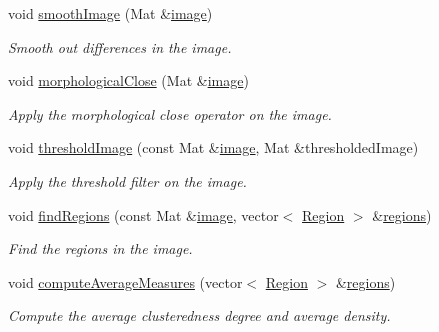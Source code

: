 \begin{DoxyCompactItemize}
void \hyperlink{classmultiscale_1_1analysis_1_1RegionDetector_a895f12ad46f2e0d1db45637a5935c2b5}{smooth\-Image} (\-Mat \&\hyperlink{classmultiscale_1_1analysis_1_1Detector_a523830a6cfe409694ce8327c3c736fbd}{image})
\begin{DoxyCompactList}\small\item\em \-Smooth out differences in the image. \end{DoxyCompactList}\item 
void \hyperlink{classmultiscale_1_1analysis_1_1RegionDetector_adcb8ab3ced63de9168734f0b24072705}{morphological\-Close} (\-Mat \&\hyperlink{classmultiscale_1_1analysis_1_1Detector_a523830a6cfe409694ce8327c3c736fbd}{image})
\begin{DoxyCompactList}\small\item\em \-Apply the morphological close operator on the image. \end{DoxyCompactList}\item 
void \hyperlink{classmultiscale_1_1analysis_1_1RegionDetector_a614cd80fac5d3df2a25c401bb221149c}{threshold\-Image} (const \-Mat \&\hyperlink{classmultiscale_1_1analysis_1_1Detector_a523830a6cfe409694ce8327c3c736fbd}{image}, \-Mat \&thresholded\-Image)
\begin{DoxyCompactList}\small\item\em \-Apply the threshold filter on the image. \end{DoxyCompactList}\item 
void \hyperlink{classmultiscale_1_1analysis_1_1RegionDetector_a886ec5ee1cd2fd816c1cfd4e2ea6778e}{find\-Regions} (const \-Mat \&\hyperlink{classmultiscale_1_1analysis_1_1Detector_a523830a6cfe409694ce8327c3c736fbd}{image}, vector$<$ \hyperlink{classmultiscale_1_1analysis_1_1Region}{\-Region} $>$ \&\hyperlink{classmultiscale_1_1analysis_1_1RegionDetector_aa6517ceb3a58295448d32e6e41499893}{regions})
\begin{DoxyCompactList}\small\item\em \-Find the regions in the image. \end{DoxyCompactList}\item 
void \hyperlink{classmultiscale_1_1analysis_1_1RegionDetector_aee096ec729a12b62fd0c61f74601aad1}{compute\-Average\-Measures} (vector$<$ \hyperlink{classmultiscale_1_1analysis_1_1Region}{\-Region} $>$ \&\hyperlink{classmultiscale_1_1analysis_1_1RegionDetector_aa6517ceb3a58295448d32e6e41499893}{regions})
\begin{DoxyCompactList}\small\item\em \-Compute the average clusteredness degree and average density. \end{DoxyCompactList}\item 

\end{DoxyCompactItemize}

